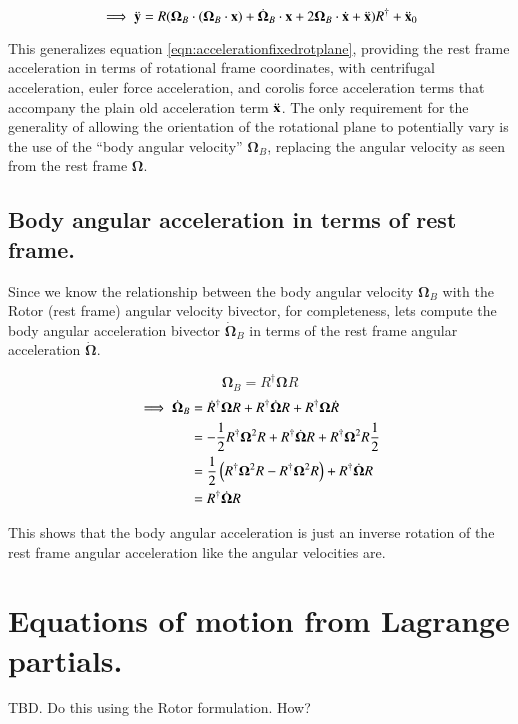 \documentclass{article}      %
\newcommand{\dt}[1]{\dot{#1}}
\newcommand{\ddt}[1]{\ddot{#1}}
\newcommand{\BOmega}[0]{\boldsymbol{\Omega}}
\begin{document}
\begin{equation}
\implies
\ddt{\By} 
= {R (\BOmega_B \cdot ( \BOmega_B \cdot \Bx ) + \dt{\BOmega}_B \cdot \Bx + 2\BOmega_B \cdot \dt{\Bx} + \ddt{\Bx}) R^\dagger} + \ddt{\Bx}_0
\end{equation}

This generalizes equation \ref{eqn:accelerationfixedrotplane}, providing the rest frame acceleration in terms of rotational frame coordinates, with centrifugal acceleration, euler force acceleration, and corolis force acceleration terms that accompany the plain old acceleration term $\ddt{\Bx}$.  The only
requirement for the generality of allowing the orientation of the rotational plane to potentially vary is the use of the ``body angular velocity''
$\BOmega_B$, replacing the angular velocity as seen from the rest frame $\BOmega$.

\subsection{ Body angular acceleration in terms of rest frame. }

Since we know the relationship between the body angular velocity $\BOmega_B$ with the Rotor (rest frame) angular velocity bivector, for
completeness, lets compute the body angular acceleration bivector $\dt{\BOmega}_B$ in terms of the rest frame angular acceleration $\dt{\BOmega}$.

\[
\BOmega_B = R^\dagger \BOmega R
\]
\begin{align*}
\implies
\dt{\BOmega}_B 
&= \dt{R}^\dagger \BOmega R +R^\dagger \dt{\BOmega} R +R^\dagger \BOmega \dt{R} \\
&= -\inv{2}R^\dagger \BOmega^2 R +R^\dagger \dt{\BOmega} R +R^\dagger \BOmega^2 R \inv{2} \\
&= \inv{2} \left(R^\dagger \BOmega^2 R - R^\dagger \BOmega^2 R\right) +R^\dagger \dt{\BOmega} R \\
&= R^\dagger \dt{\BOmega} R \\
\end{align*}

This shows that the body angular acceleration is just an inverse rotation of the rest frame angular acceleration like the angular velocities are.

\section{ Equations of motion from Lagrange partials. }

TBD.  Do this using the Rotor formulation.  How?
\end{document}
